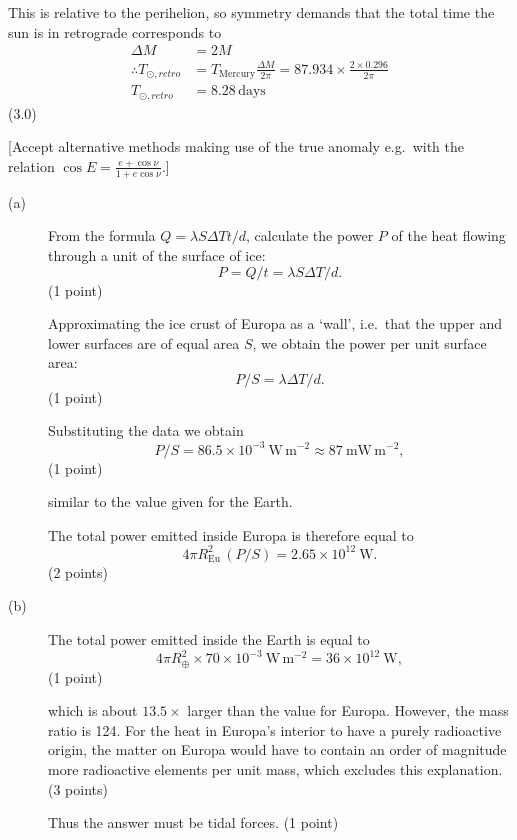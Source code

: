 This is relative to the perihelion, so symmetry demands that the total time the sun is in
retrograde corresponds to
\begin{align*}
\Delta M &= 2M\\
\therefore T_{\odot,retro} &= T_{\mathrm{Mercury}}\frac{\Delta M}{2\pi}
  = 87.934 \times \frac{2 \times 0.296}{2\pi}\\
T_{\odot,retro} &= \boxed{8.28\,\mathrm{days}}
\end{align*}
\hfill(3.0)

[Accept alternative methods making use of the true anomaly e.g.\ with the relation
$\cos E = \frac{e + \cos\nu}{1 + e\cos\nu}$.]

\begin{description}
\item[(a)] From the formula $Q = \lambda S \Delta T t / d$, calculate the power
  $P$ of the heat flowing through a unit of the surface of ice:
  \[
    P = Q/t = \lambda S \Delta T / d.
  \]
  \hfill(1 point)

  Approximating the ice crust of Europa as a `wall', i.e.\ that the upper and
  lower surfaces are of equal area $S$, we obtain the power per unit surface
  area:
  \[
    P/S = \lambda \Delta T / d.
  \]
  \hfill(1 point)

  Substituting the data we obtain
  \[
    P/S = 86.5 \times 10^{-3}\ \mathrm{W\,m^{-2}}
        \approx 87\ \mathrm{mW\,m^{-2}},
  \]
  \hfill(1 point)

  similar to the value given for the Earth.

  The total power emitted inside Europa is therefore equal to
  \[
    4\pi R_{\mathrm{Eu}}^2 \, (P/S) = 2.65 \times 10^{12}\ \mathrm{W}.
  \]
  \hfill(2 points)

\item[(b)] The total power emitted inside the Earth is equal to
  \[
    4\pi R_{\oplus}^2 \times 70 \times 10^{-3}\ \mathrm{W\,m^{-2}}
      = 36 \times 10^{12}\ \mathrm{W},
  \]
  \hfill(1 point)

  which is about $13.5\times$ larger than the value for Europa. However, the
  mass ratio is 124. For the heat in Europa's interior to have a purely
  radioactive origin, the matter on Europa would have to contain an order of
  magnitude more radioactive elements per unit mass, which excludes this
  explanation.
  \hfill(3 points)

  Thus the answer must be tidal forces.
  \hfill(1 point)
\end{description}

